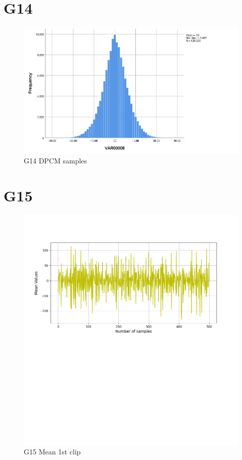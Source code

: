 \documentclass[hidelinks, 12pt, a4paper]{article}
\begin{document}
\section{G14}
\begin{figure}[h!]
	\centering
		\includegraphics[height=.38\textheight, width=\textwidth]{assets/session2/g14.png}
		\caption{G14 DPCM  samples}
	\end{figure}

\section{G15}

\begin{figure}[h!]
\centering
	\includegraphics[height=.38\textheight, width=\textwidth]{assets/session2/g15.png}
    \caption{G15 Mean 1st clip}
\end{figure}
\end{document}
